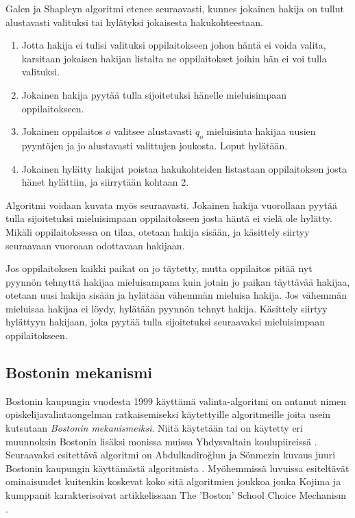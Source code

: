 \documentclass[gradu, twoside]{tktltiki}
\begin{document}
Galen ja Shapleyn algoritmi etenee seuraavasti, kunnes jokainen hakija
on tullut alustavasti valituksi tai hylätyksi jokaisesta
hakukohteestaan.

\begin{enumerate}
\item Jotta hakija ei tulisi valituksi oppilaitokseen johon häntä ei
  voida valita, karsitaan jokaisen hakijan listalta ne oppilaitokset
  joihin hän ei voi tulla valituksi.

\item Jokainen hakija pyytää tulla sijoitetuksi hänelle mieluisimpaan
  oppilaitokseen.

\item Jokainen oppilaitos $o$ valitsee alustavasti $q_o$ mieluisinta
  hakijaa uusien pyyntöjen ja jo alustavasti valittujen joukosta.
  Loput hylätään.

\item Jokainen hylätty hakijat poistaa hakukohteiden listastaan
  oppilaitoksen josta hänet hylättiin, ja siirrytään kohtaan 2.
\end{enumerate}

Algoritmi voidaan kuvata myös seuraavasti. Jokainen hakija vuorollaan
pyytää tulla sijoitetuksi mieluisimpaan oppilaitokseen josta häntä ei
vielä ole hylätty. Mikäli oppilaitoksessa on tilaa, otetaan hakija
sisään, ja käsittely siirtyy seuraavaan vuoroaan odottavaan hakijaan.

Jos oppilaitoksen kaikki paikat on jo täytetty, mutta oppilaitos pitää
nyt pyynnön tehnyttä hakijaa mieluisampana kuin jotain jo paikan
täyttävää hakijaa, otetaan uusi hakija sisään ja hylätään vähemmän
mieluisa hakija. Jos vähemmän mieluisaa hakijaa ei löydy, hylätään
pyynnön tehnyt hakija. Käsittely siirtyy hylättyyn hakijaan, joka
pyytää tulla sijoitetuksi seuraavaksi mieluisimpaan oppilaitokseen.

\subsection{Bostonin mekanismi}

Bostonin kaupungin vuodesta 1999 käyttämä valinta-algoritmi on antanut
nimen opiskelijavalintaongelman ratkaisemiseksi käytettyille
algoritmeille joita usein kutsutaan \emph{Bostonin mekanismeiksi}.
Niitä käytetään tai on käytetty eri muunnoksin Bostonin lisäksi
monissa muissa Yhdysvaltain koulupiireissä \cite{abdusön03}.
Seuraavaksi esitettävä algoritmi on Abdulkadiroğlun ja Sönmezin kuvaus
juuri Bostonin kaupungin käyttämästä algoritmista \cite{abdusön03}.
Myöhemmissä luvuissa esiteltävät ominaisuudet kuitenkin koskevat koko
sitä algoritmien joukkoa jonka Kojima ja kumppanit karakterisoivat
artikkelissaan The 'Boston' School Choice Mechanism \cite{kojima10}.
\end{document}

